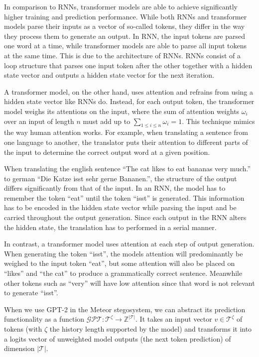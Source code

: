 In comparison to RNNs, transformer models are able to achieve significantly higher training and prediction performance.
While both RNNs and transformer models parse their inputs as a vector of so-called tokens, they differ in the way they process them to generate an output.
In RNN, the input tokens are parsed one word at a time, while transformer models are able to parse all input tokens at the same time.
This is due to the architecture of RNNs.
RNNs consist of a loop structure that parses one input token after the other together with a hidden state vector and outputs a hidden state vector for the next iteration.

A transformer model, on the other hand, uses attention and refrains from using a hidden state vector like RNNs do.
Instead, for each output token, the transformer model weighs its attentions on the input, where the sum of attention weights $\omega_i$ over an input of length $n$ must add up to $\sum_{1\leq i \leq n} \omega_i = 1$.
This technique mimics the way human attention works.
For example, when translating a sentence from one language to another, the translator puts their attention to different parts of the input to determine the correct output word at a given position.

\begin{example}
  When translating the english sentence ``The cat likes to eat bananas very much.'' to german ``Die Katze isst sehr gerne Bananen.'', the structure of the output differs significantly from that of the input.
  In an RNN, the model has to remember the token ``eat'' until the token ``isst'' is generated.
  This information has to be encoded in the hidden state vector while parsing the input and be carried throughout the output generation.
  Since each output in the RNN alters the hidden state, the translation has to performed in a serial manner.
    
  In contrast, a transformer model uses attention at each step of output generation.
  When generating the token ``isst'', the models attention will predominantly be weighed to the input token ``eat'', but some attention will also be placed on ``likes'' and ``the cat'' to produce a grammatically correct sentence.
  Meanwhile other tokens such as ``very'' will have low attention since that word is not relevant to generate ``isst''.
\end{example}



When we use GPT-2 in the Meteor stegosystem, we can abstract its prediction functionality as a function $\mathcal{GPT} \colon \mathcal{T}^\zeta \rightarrow \mathbb{Z}^{|\mathcal{T}|}$.
It takes an input vector $v \in \mathcal{T}^\zeta$ of tokens (with $\zeta$ the history length supported by the model) and transforms it into a logits vector of unweighted model outputs (the next token prediction) of dimension $|\mathcal{T}|$.


